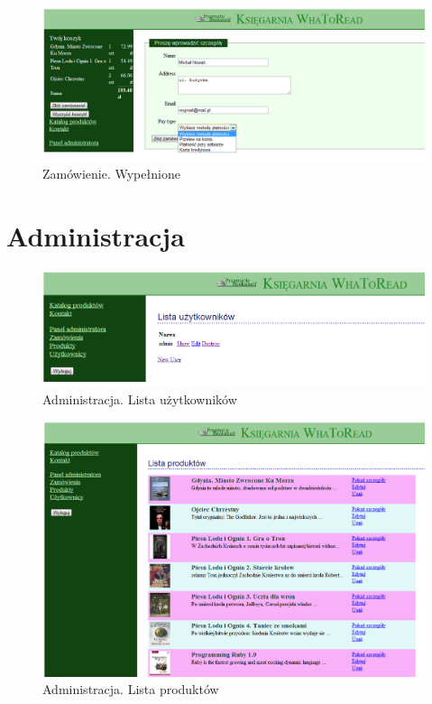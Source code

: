 \documentclass[pdflatex,11pt]{aghdpl}
\begin{document}

\begin{figure}[!h]
\centering
\includegraphics[width=\textwidth]{zamowienie_wypelnione}
\caption{Zamówienie. Wypełnione}
\label{fig:zamowienie_wypelnione}
\end{figure}

\clearpage


\section{Administracja}

\begin{figure}[!h]
\centering
\includegraphics[width=\textwidth]{admin_uzytkownicy}
\caption{Administracja. Lista użytkowników}
\label{fig:admin_uzytkownicy}
\end{figure}


\begin{figure}[!h]
\centering
\includegraphics[width=\textwidth]{admin_produkty}
\caption{Administracja. Lista produktów}
\label{fig:admin_produkty}
\end{figure}
\end{document}
